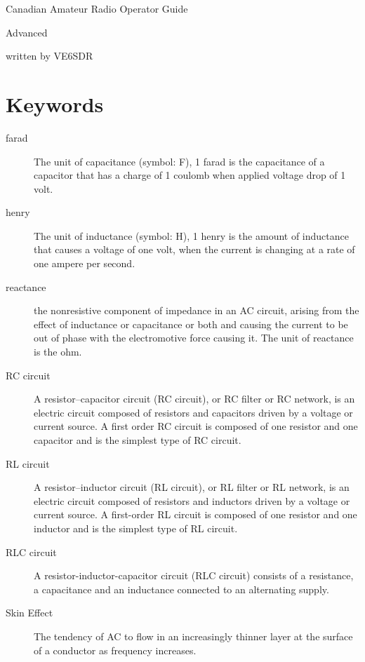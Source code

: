 \documentclass[letterpaper]{article}
\begin{document}
    \begin{center}
        \Large
        Canadian Amateur Radio Operator Guide

        Advanced

        \large
        written by VE6SDR
    \end{center}

    \tableofcontents
    \newpage

    \section*{Keywords}
        \begin{description}
            \item[farad] The unit of capacitance (symbol: F), 1 farad is the capacitance of a capacitor that has a charge of 1 coulomb when applied voltage drop of 1 volt.
            \item[henry] The unit of inductance (symbol: H), 1 henry is the amount of inductance that causes a voltage of one volt, when the current is changing at a rate of one ampere per second.
            \item[reactance] the nonresistive component of impedance in an AC circuit, arising from the effect of inductance or capacitance or both and causing the current to be out of phase with the electromotive force causing it.
                The unit of reactance is the ohm.
            \item[RC circuit] A resistor–capacitor circuit (RC circuit), or RC filter or RC network, is an electric circuit composed of resistors and capacitors driven by a voltage or current source. A first order RC circuit is composed of one resistor and one capacitor and is the simplest type of RC circuit.
            \item[RL circuit] A resistor–inductor circuit (RL circuit), or RL filter or RL network, is an electric circuit composed of resistors and inductors driven by a voltage or current source. A first-order RL circuit is composed of one resistor and one inductor and is the simplest type of RL circuit.
            \item[RLC circuit] A resistor-inductor-capacitor circuit (RLC circuit) consists of a resistance, a capacitance and an inductance connected to an alternating supply.
            \item[Skin Effect] The tendency of AC to flow in an increasingly thinner layer at the surface of a conductor as frequency increases.
        \end{description}
\end{document}
